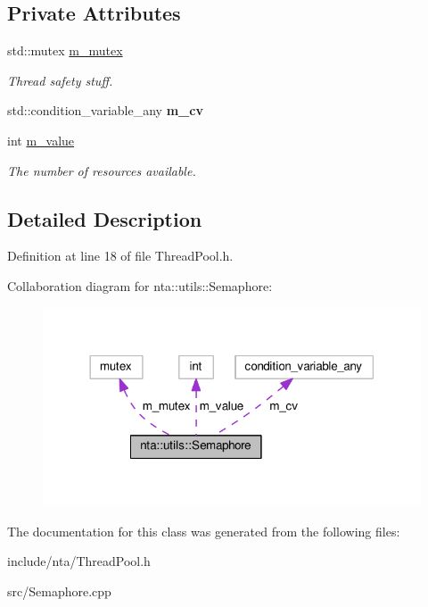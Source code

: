 \subsection*{Private Attributes}
\begin{DoxyCompactItemize}
\item 
\mbox{\label{classnta_1_1utils_1_1Semaphore_a5d349e7ced70eb07eea6b9cfa50a6637}} 
std\+::mutex \hyperlink{classnta_1_1utils_1_1Semaphore_a5d349e7ced70eb07eea6b9cfa50a6637}{m\+\_\+mutex}
\begin{DoxyCompactList}\small\item\em Thread safety stuff. \end{DoxyCompactList}\item 
\mbox{\label{classnta_1_1utils_1_1Semaphore_a30bfcf40c58c71847933806aeab36b30}} 
std\+::condition\+\_\+variable\+\_\+any {\bfseries m\+\_\+cv}
\item 
\mbox{\label{classnta_1_1utils_1_1Semaphore_a7b21b47d4cfecfeeb97758916e23c9bc}} 
int \hyperlink{classnta_1_1utils_1_1Semaphore_a7b21b47d4cfecfeeb97758916e23c9bc}{m\+\_\+value}
\begin{DoxyCompactList}\small\item\em The number of resources available. \end{DoxyCompactList}\end{DoxyCompactItemize}


\subsection{Detailed Description}


Definition at line 18 of file Thread\+Pool.\+h.



Collaboration diagram for nta\+:\+:utils\+:\+:Semaphore\+:
\nopagebreak
\begin{figure}[H]
\begin{center}
\leavevmode
\includegraphics[width=318pt]{da/d79/classnta_1_1utils_1_1Semaphore__coll__graph}
\end{center}
\end{figure}


The documentation for this class was generated from the following files\+:\begin{DoxyCompactItemize}
\item 
include/nta/Thread\+Pool.\+h\item 
src/Semaphore.\+cpp\end{DoxyCompactItemize}
